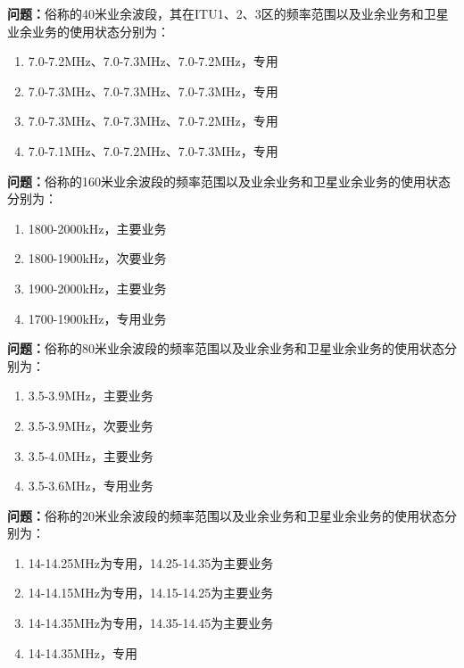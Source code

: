 \bigskip


\noindent\textbf{问题：}俗称的40米业余波段，其在ITU1、2、3区的频率范围以及业余业务和卫星业余业务的使用状态分别为：
\begin{enumerate}[label=\Alph*), leftmargin=3em]
\item 7.0-7.2MHz、7.0-7.3MHz、7.0-7.2MHz，专用
\item 7.0-7.3MHz、7.0-7.3MHz、7.0-7.3MHz，专用
\item 7.0-7.3MHz、7.0-7.3MHz、7.0-7.2MHz，专用
\item 7.0-7.1MHz、7.0-7.2MHz、7.0-7.3MHz，专用
\end{enumerate}

\bigskip


\noindent\textbf{问题：}俗称的160米业余波段的频率范围以及业余业务和卫星业余业务的使用状态分别为：
\begin{enumerate}[label=\Alph*), leftmargin=3em]
\item 1800-2000kHz，主要业务
\item 1800-1900kHz，次要业务
\item 1900-2000kHz，主要业务
\item 1700-1900kHz，专用业务
\end{enumerate}

\bigskip


\noindent\textbf{问题：}俗称的80米业余波段的频率范围以及业余业务和卫星业余业务的使用状态分别为：
\begin{enumerate}[label=\Alph*), leftmargin=3em]
\item 3.5-3.9MHz，主要业务
\item 3.5-3.9MHz，次要业务
\item 3.5-4.0MHz，主要业务
\item 3.5-3.6MHz，专用业务
\end{enumerate}

\bigskip


\noindent\textbf{问题：}俗称的20米业余波段的频率范围以及业余业务和卫星业余业务的使用状态分别为：
\begin{enumerate}[label=\Alph*), leftmargin=3em]
\item 14-14.25MHz为专用，14.25-14.35为主要业务
\item 14-14.15MHz为专用，14.15-14.25为主要业务
\item 14-14.35MHz为专用，14.35-14.45为主要业务
\item 14-14.35MHz，专用
\end{enumerate}

\bigskip


